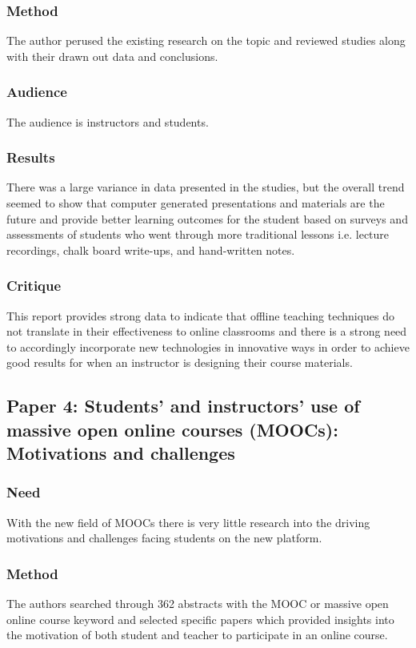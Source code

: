 \documentclass[
	letterpaper, %
]{jdf}
\begin{document}
\subsubsection{Method}
The author perused the existing research on the topic and reviewed studies along with their drawn out data and conclusions.
\subsubsection{Audience}
The audience is instructors and students.
\subsubsection{Results}
There was a large variance in data presented in the studies, but the overall trend seemed to show that computer generated presentations and materials are the future and provide better learning outcomes for the student based on surveys and assessments of students who went through more traditional lessons i.e. lecture recordings, chalk board write-ups, and hand-written notes.
\subsubsection{Critique}
This report provides strong data to indicate that offline teaching techniques do not translate in their effectiveness to online classrooms and there is a strong need to accordingly incorporate new technologies in innovative ways in order to achieve good results for when an instructor is designing their course materials.

\subsection{Paper 4: Students’ and instructors’ use of massive open online courses (MOOCs): Motivations and challenges \citep{hew1}}
\subsubsection{Need}
With the new field of MOOCs there is very little research into the driving motivations and challenges facing students on the new platform. 
\subsubsection{Method}
The authors searched through 362 abstracts with the MOOC or massive open online course keyword and selected specific papers which provided insights into the motivation of both student and teacher to participate in an online course.
\end{document}
